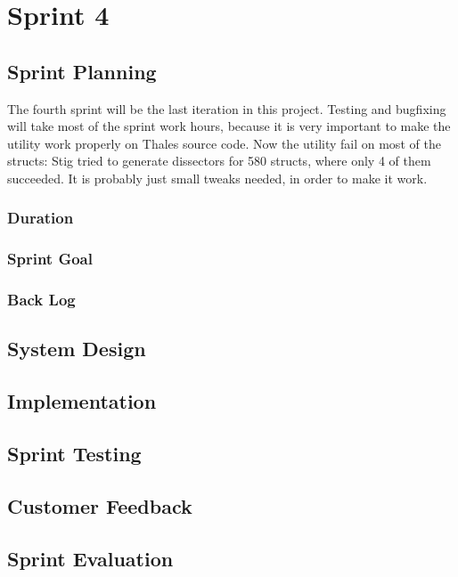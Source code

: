 \chapter{Sprint 4}


\section{Sprint Planning}
The fourth sprint will be the last iteration in this project. Testing and bugfixing will take most of the sprint work hours, because it is very important to make the utility work properly on Thales source code. Now the utility fail on most of the structs: Stig tried to generate dissectors for 580 structs, where only 4 of them succeeded. It is probably just small tweaks needed, in order to make it work. 

\subsection{Duration}

\subsection{Sprint Goal}

\subsection{Back Log}


\section{System Design}


\section{Implementation}


\section{Sprint Testing}


\section{Customer Feedback}


\section{Sprint Evaluation}


